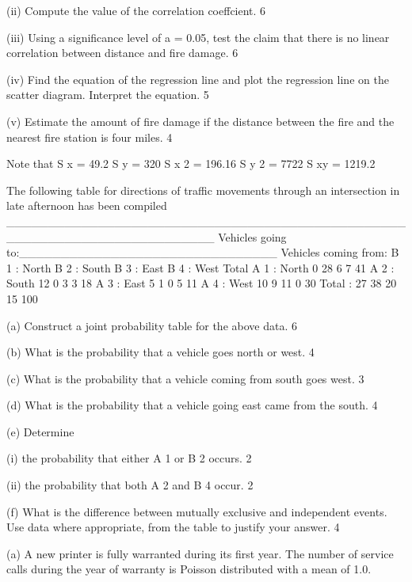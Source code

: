 (ii)  Compute the value of the correlation coeffcient. 				6 
 
(iii) Using a significance level of a = 0.05, test the claim that there is no linear      correlation  between distance and fire damage. 				 6 
 
(iv)  Find the equation of the regression line and plot the regression line on the scatter  diagram. Interpret the equation. 					5 
 
(v)  Estimate the amount of fire damage if the distance between the fire and the  nearest  fire station is four miles. 						4 
 
Note that 
S x = 49.2 
S y = 320 
S x 2 = 196.16 
S y 2 = 7722 
S xy = 1219.2 
 
	
The following table for directions of traffic movements through an intersection in late afternoon has been compiled 
_________________________________________________________________________
Vehicles going to:_______________________________
Vehicles coming from:	B 1 : North 	B 2 : South    B 3 : East     B 4 : West      Total 
A 1 : North 			0 		28 	       6 		   7 	  41 
A 2 : South 			12 		0 	       3 		   3 	  18 
A 3 : East 			 	5 		1 	        0 		   5           11 
A 4 : West 			10 		9 	       11              	    0          30         
Total : 				27 		38 	       20                    15        100 
 	
(a) Construct a joint probability table for the above data. 			6 
 
(b) What is the probability that a vehicle goes north or west. 			4 
 
(c) What is the probability that a vehicle coming from south goes west. 	3 
 
(d) What is the probability that a vehicle going east came from the south. 	4 
 
(e) Determine 
 
  (i) the probability that either A 1 or B 2 occurs. 				2 
 
 (ii) the probability that both A 2 and B 4 occur. 				2 
 
 (f)  What is the difference between mutually exclusive and independent events.  Use data  where appropriate, from the table to justify your answer. 4
 
 

(a) A new printer is fully warranted during its first year. The number of service calls  during the year of warranty is Poisson distributed with a mean of 1.0. 
 
